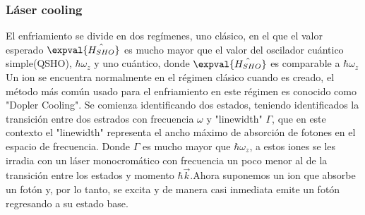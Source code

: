 \subsubsection{Láser cooling}
El enfriamiento se divide en dos regímenes, uno clásico, en el que el valor esperado $\expval{\hat{H_{SHO}}}$ es mucho mayor que el valor del oscilador cuántico simple(QSHO), $\hbar\omega_{z}$ y uno cuántico, donde $\expval{\hat{H_{SHO}}}$ es comparable a $\hbar\omega_{z}$
Un ion se encuentra normalmente en el régimen clásico cuando es creado, el método más común usado para el enfriamiento en este régimen es conocido como "Dopler Cooling". Se comienza identificando dos estados, teniendo identificados la transición entre dos estrados con frecuencia $\omega$ y "linewidth" $\Gamma$, que en este contexto el "linewidth" representa el ancho máximo de absorción de fotones en el espacio de frecuencia. Donde $\Gamma$ es mucho mayor que $\hbar\omega_{z}$, a estos iones se les irradia con un láser monocromático con frecuencia un poco menor al de la transición entre los estados y momento $\hbar\Vec{k}$.Ahora suponemos un ion que absorbe un fotón y, por lo tanto, se excita y de manera casi inmediata emite un fotón regresando a su estado base.

